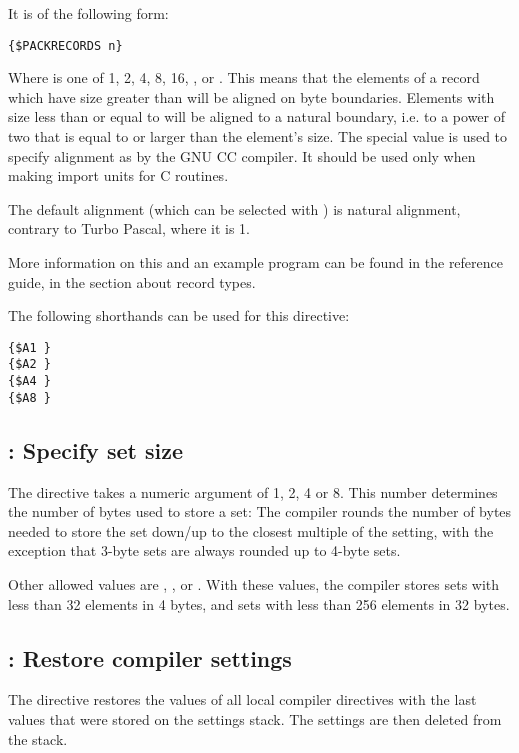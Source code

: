 It is of the following form:
\begin{verbatim}
{$PACKRECORDS n}
\end{verbatim}

Where  is one of 1, 2, 4, 8, 16, ,  or .
This means that the elements of a record which have size greater than 
will be aligned on  byte boundaries. Elements with size less than or
equal to  will be aligned to a natural boundary, i.e. to a power of
two that is equal to or larger than the element's size. The special value 
 is used to specify alignment as by the GNU CC compiler. It should 
be used only when making import units for C routines.

The default alignment (which can be selected with ) is natural
alignment, contrary to Turbo Pascal, where it is 1.

More information on this and an example program can be found in the reference
guide, in the section about record types.

The following shorthands can be used for this directive:
\begin{verbatim}
{$A1 }
{$A2 }
{$A4 }
{$A8 }
\end{verbatim}

\subsection{ : Specify set size}
\label{se:Packset}
The  directive takes a numeric argument of 1, 2, 4 or 8.
This number determines the number of bytes used to store a set: 
The compiler rounds the number of bytes needed to store the set 
down/up to the closest multiple of the  setting, 
with the exception that 3-byte sets are always rounded up to 4-byte 
sets.

Other allowed values are , , or . 
With these values, the compiler stores sets with less than 32 elements 
in 4 bytes, and sets with less than 256 elements in 32 bytes. 

\subsection{ : Restore compiler settings}
\label{se:Pop}
The  directive restores the values of all local compiler
directives with the last values that were stored on the settings stack. 
The settings are then deleted from the stack.


